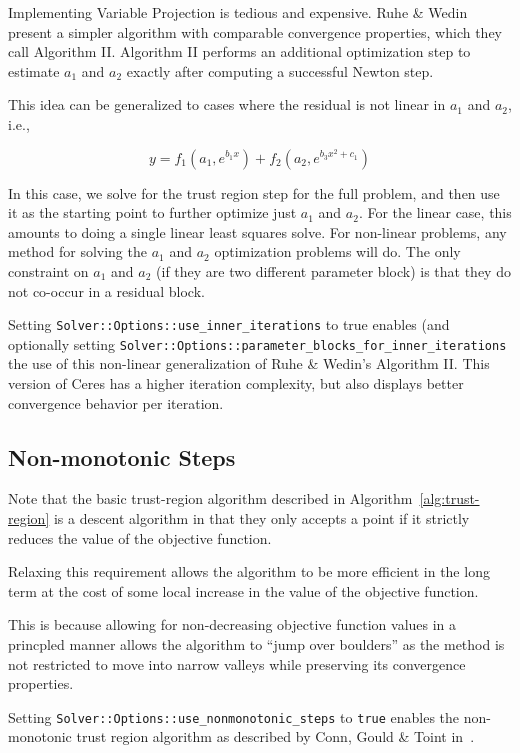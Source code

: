 Implementing Variable Projection is tedious and expensive. Ruhe \&
Wedin present a simpler algorithm with comparable convergence
properties, which they call Algorithm II.  Algorithm II performs an
additional optimization step to estimate $a_1$ and $a_2$ exactly after
computing a successful Newton step.


This idea can be generalized to cases where the residual is not
linear in $a_1$ and $a_2$, i.e.,

\begin{equation}
  y = f_1(a_1, e^{b_1 x}) + f_2(a_2, e^{b_3 x^2 + c_1})
\end{equation}

In this case, we solve for the trust region step for the full problem,
and then use it as the starting point to further optimize just $a_1$
and $a_2$. For the linear case, this amounts to doing a single linear
least squares solve. For non-linear problems, any method for solving
the $a_1$ and $a_2$ optimization problems will do. The only constraint
on $a_1$ and $a_2$ (if they are two different parameter block) is that
they do not co-occur in a residual block.

Setting \texttt{Solver::Options::use\_inner\_iterations} to true
enables (and optionally setting
\texttt{Solver::Options::parameter\_blocks\_for\_inner\_iterations}
the use of this non-linear generalization of Ruhe \& Wedin's Algorithm
II.  This version of Ceres has a higher iteration complexity, but also
displays better convergence behavior per iteration.

\subsection{Non-monotonic Steps}
\label{sec:non-monotonic}
Note that the basic trust-region algorithm described in
Algorithm~\ref{alg:trust-region} is a descent algorithm  in that they
only accepts a point if it strictly reduces the value of the objective
function.

Relaxing this requirement allows the algorithm to be more
efficient in the long term at the cost of some local increase
in the value of the objective function.

This is because allowing for non-decreasing objective function
values in a princpled manner allows the algorithm to ``jump over
boulders'' as the method is not restricted to move into narrow
valleys while preserving its convergence properties.

Setting \texttt{Solver::Options::use\_nonmonotonic\_steps} to \texttt{true}
enables the non-monotonic trust region algorithm as described by
Conn,  Gould \& Toint in~\cite{conn2000trust}.


